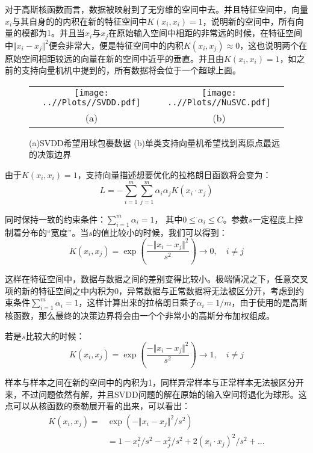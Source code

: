 \documentclass[UTF8, 12pt]{ctexart}
\begin{document}
对于高斯核函数而言，数据被映射到了无穷维的空间中去。并且特征空间中，向量$x_{i}$与其自身的的内积在新的特征空间中$K(x_{i}, x_{i}) = 1$，说明新的空间中，所有向量的模都为1。并且当$x_{i}$与$x_{j}$在原始输入空间中相距的非常远的时候，在特征空间中${\Vert x_{i} - x_{j} \Vert}^{2}$便会非常大，便是特征空间中的内积$K(x_{i}, x_{j}) \approx 0$，这也说明两个在原始空间相距较远的向量在新的空间中近乎的垂直。并且由$K(x_{i}, x_{i}) = 1$，如之前的支持向量机机中提到的，所有数据将会位于一个超球上面。

\begin{figure}[H]
	\centering
	\begin{tabular}{cc}
		\texttt{[image: ..//Plots//SVDD.pdf]}  & 
		\texttt{[image: ..//Plots//NuSVC.pdf]} \\
		(a) & (b)\\
	\end{tabular}
	\caption{(a)SVDD希望用球包裹数据 (b)单类支持向量机希望找到离原点最远的决策边界}
	\label{Fig:2}
	\vspace{-0.5em}
\end{figure}


由于$K(x_{i}, x_{i}) = 1$，支持向量描述想要优化的拉格朗日函数将会变为：
\begin{equation}
	L = - \sum_{i=1}^{m}\sum_{j=1}^{m}\alpha_{i}\alpha_{j}K(x_{i}·x_{j})
\end{equation}

同时保持一致的约束条件：$\sum_{i=1}^{m}\alpha_{i} = 1$， 其中$0 \leq \alpha_{i} \leq C$。参数$s$一定程度上控制着分布的“宽度”。当$s$的值比较小的时候，我们可以得到：
\begin{equation}
	K(x_{i}, x_{j}) = \exp(\frac{-{\Vert x_{i} - x_{j} \Vert}^{2}}{s^2}) \to 0, \quad i \neq j
\end{equation}

这样在特征空间中，数据与数据之间的差别变得比较小。极端情况之下，任意交叉项的新的特征空间之中内积为0，异常数据与正常数据将无法被区分开，考虑到约束条件$\sum_{i=1}^{m}\alpha_{i} = 1$，这样计算出来的拉格朗日乘子$\alpha_{i}=1/m$，由于使用的是高斯核函数，那么最终的决策边界将会由一个个非常小的高斯分布加权组成。

若是$s$比较大的时候：
\begin{equation}
K(x_{i}, x_{j}) = \exp(\frac{-{\Vert x_{i} - x_{j} \Vert}^{2}}{s^2}) \to 1, \quad i \neq j
\end{equation}

样本与样本之间在新的空间中的内积为1，同样异常样本与正常样本无法被区分开来，不过问题依然有解，并且SVDD问题的解在原始的输入空间将退化为球形。这点可以从核函数的泰勒展开看的出来，可以看出：
\begin{align}
	K(x_{i}, x_{j}) = & \exp(-{\Vert x_{i} - x_{j} \Vert}^{2}/s^{2}) \\
	& = 1 - x_{i}^{2}/s^{2} - x_{j}^{2}/s^{2} + 2(x_{i}·x_{j})^{2}/s^{2} + ...
\end{align}
\end{document}
